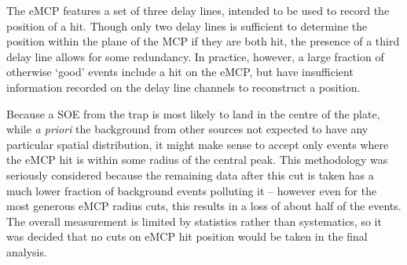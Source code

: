 The eMCP features a set of three delay lines, intended to be used to record the position of a hit.
Though only two delay lines is sufficient to determine the position within the plane of the MCP if they are both hit, the presence of a third delay line allows for some redundancy.  In practice, however, a large fraction of otherwise `good' events include a hit on the eMCP, but have insufficient information recorded on the delay line channels to reconstruct a position.  


Because a SOE from the trap is most likely to land in the centre of the plate, while \emph{a priori} the background from other sources not expected to have any particular spatial distribution,  it might make sense to accept only events where the eMCP hit is within some radius of the central peak.  This methodology was seriously considered because the remaining data after this cut is taken has a much lower fraction of background events polluting it -- however even for the most generous eMCP radius cuts, this results in a loss of about half of the events.  The overall measurement is limited by statistics rather than systematics, so it was decided that no cuts on eMCP hit position would be taken in the final analysis.


